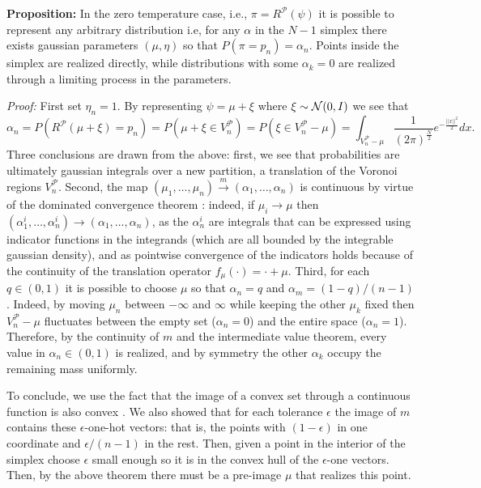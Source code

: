 \textbf{Proposition:} In the zero temperature case, i.e., $\pi  = R^\mathcal{P}(\psi)$ it is possible to represent any arbitrary distribution i.e, for any $\alpha$ in the $N-1$ simplex there exists gaussian parameters $(\mu, \eta)$ so that   $P(\pi = p_n)  = \alpha_n$. Points inside the simplex are realized directly, while distributions with some $\alpha_k=0$ are realized through a limiting process in the parameters.

\textit{Proof:} First set $\eta_n=1$. By representing $\psi = \mu + \xi$ where $\xi\sim\mathcal{N}(0, I)$ we see that
$$\alpha_n = P(R^\mathcal{P}(\mu + \xi) = p_n ) = P(\mu + \xi \in V^\mathcal{P}_{n}) = P(\xi \in V^\mathcal{P}_{n} - \mu) =  \int_{V^\mathcal{P}_{n} - \mu} \frac{1}{(2\pi)^\frac{N}{2}}e^{-\frac{||x||^2}{2}} dx.$$
Three conclusions are drawn from the above: first, we see that probabilities are ultimately gaussian integrals over a new partition, a translation of the Voronoi regions $V^\mathcal{P}_{n}$. Second,
the map $(\mu_1,\ldots,  \mu_n)\xrightarrow{m} (\alpha_1,\ldots, \alpha_n)$ is continuous by virtue of the dominated convergence theorem \cite{browder2012mathematical}: indeed, if $\mu_i\rightarrow \mu$ then $(\alpha^i_1,\ldots, \alpha^i_n) \rightarrow (\alpha_1,\ldots, \alpha_n)$, as the $\alpha^i_n$ are integrals that can be expressed using indicator functions in the integrands (which are all bounded by the integrable gaussian density), and as pointwise convergence of the indicators holds because of the continuity of the translation operator $f_\mu(\cdot) = \cdot + \mu$. Third, for each $q\in(0,1)$ it is possible to choose $\mu$ so that $\alpha_n =q$ and $\alpha_m = (1-q)/(n-1)$. Indeed, by moving $\mu_n$ between $-\infty$ and $\infty$ while keeping the other $\mu_k$ fixed then $V^\mathcal{P}_{n} - \mu$ fluctuates between the empty set ($\alpha_n =0$) and the entire space ($\alpha_n=1$). Therefore, by the continuity of $m$ and the intermediate value theorem, every value in $\alpha_n\in (0,1)$ is realized, and by symmetry the other $\alpha_k$ occupy the remaining mass uniformly. 

To conclude, we use the fact that the image of a convex set through a continuous function is also convex \cite{Rockafellar70}. We also showed that for each tolerance $\epsilon$ the image of $m$ contains these $\epsilon$-one-hot vectors: that is, the points with $(1-\epsilon)$ in one coordinate and $\epsilon/ (n-1)$ in the rest. Then, given a point in the interior of the simplex choose $\epsilon$ small enough so it is in the convex hull of the $\epsilon$-one vectors. Then, by the above theorem there must be a pre-image $\mu$ that realizes this point.

